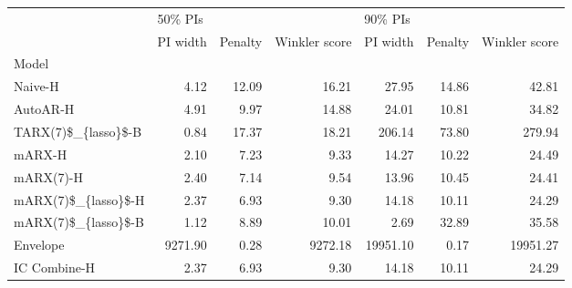 \begin{tabular}{lrrrrrr}
\toprule
{} & \multicolumn{3}{l}{50\% PIs} & \multicolumn{3}{l}{90\% PIs} \\
{} & PI width & Penalty & Winkler score &  PI width & Penalty & Winkler score \\
Model               &          &         &               &           &         &               \\
\midrule
Naive-H             &     4.12 &   12.09 &         16.21 &     27.95 &   14.86 &         42.81 \\
AutoAR-H            &     4.91 &    9.97 &         14.88 &     24.01 &   10.81 &         34.82 \\
TARX(7)\$\_\{lasso\}\$-B &     0.84 &   17.37 &         18.21 &    206.14 &   73.80 &        279.94 \\
mARX-H              &     2.10 &    7.23 &          9.33 &     14.27 &   10.22 &         24.49 \\
mARX(7)-H           &     2.40 &    7.14 &          9.54 &     13.96 &   10.45 &         24.41 \\
mARX(7)\$\_\{lasso\}\$-H &     2.37 &    6.93 &          9.30 &     14.18 &   10.11 &         24.29 \\
mARX(7)\$\_\{lasso\}\$-B &     1.12 &    8.89 &         10.01 &      2.69 &   32.89 &         35.58 \\
Envelope            &  9271.90 &    0.28 &       9272.18 &  19951.10 &    0.17 &      19951.27 \\
IC Combine-H        &     2.37 &    6.93 &          9.30 &     14.18 &   10.11 &         24.29 \\
\bottomrule
\end{tabular}
